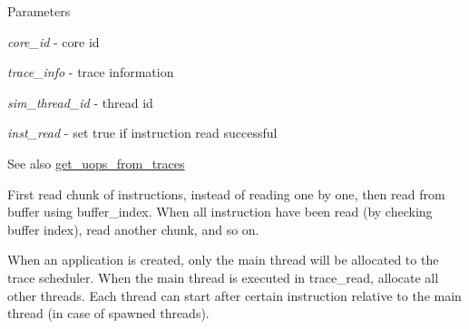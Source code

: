 \begin{DoxyParams}{Parameters}
\item[{\em core\_\-id}]-\/ core id \item[{\em trace\_\-info}]-\/ trace information \item[{\em sim\_\-thread\_\-id}]-\/ thread id \item[{\em inst\_\-read}]-\/ set true if instruction read successful \end{DoxyParams}
\begin{DoxySeeAlso}{See also}
\hyperlink{classtrace__read__c_a262fb0303f53144c30c267dc3e454c6c}{get\_\-uops\_\-from\_\-traces} 
\end{DoxySeeAlso}


First read chunk of instructions, instead of reading one by one, then read from buffer using buffer\_\-index. When all instruction have been read (by checking buffer index), read another chunk, and so on.

When an application is created, only the main thread will be allocated to the trace scheduler. When the main thread is executed in trace\_\-read, allocate all other threads. Each thread can start after certain instruction relative to the main thread (in case of spawned threads).

